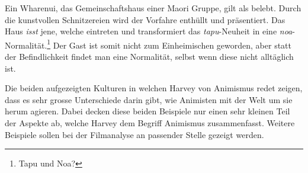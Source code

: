 Ein Wharenui, das Gemeinschaftshaus einer Maori Gruppe, gilt als belebt. Durch die kunstvollen Schnitzereien wird der Vorfahre enthüllt und präsentiert. Das Haus \emph{isst} jene, welche eintreten und transformiert das \emph{tapu}-Neuheit in eine \emph{noa}-Normalität.\footnote{Tapu und Noa?} Der Gast ist somit nicht zum Einheimischen geworden, aber statt der Befindlichkeit findet man eine Normalität, selbst wenn diese nicht alltäglich ist. 

\smallskip
Die beiden aufgezeigten Kulturen in welchen Harvey von Animismus redet zeigen, dass es sehr grosse Unterschiede darin gibt, wie Animisten mit der Welt um sie herum agieren. Dabei decken diese beiden Beispiele nur einen sehr kleinen Teil der Aspekte ab, welche Harvey dem Begriff Animismus zusammenfasst. Weitere Beispiele sollen bei der Filmanalyse an passender Stelle gezeigt werden.




